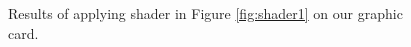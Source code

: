 \begin{figure}[t!]
 \centering   
  \caption{Results of applying shader in Figure \ref{fig:shader1}  on our graphic card.}
   \label{fig:prec}
\end{figure} 





